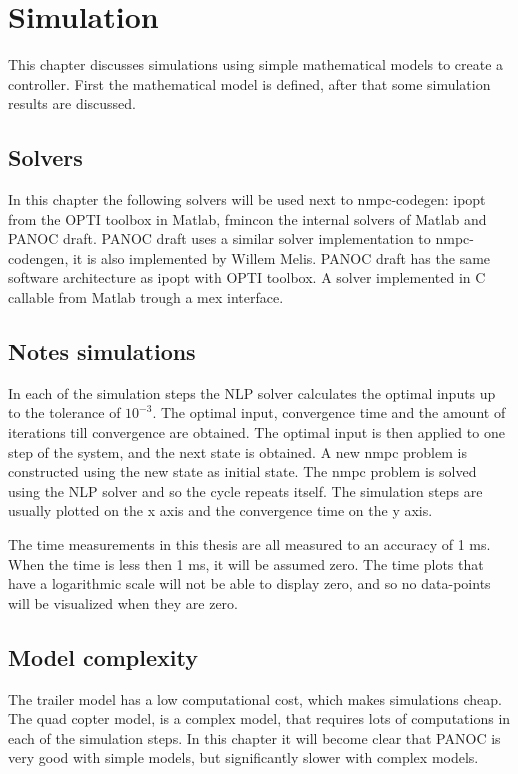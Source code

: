 \chapter{Simulation}
This chapter discusses simulations using simple mathematical models to create a controller. First the mathematical model is defined, after that some simulation results are discussed.

\section{Solvers}
In this chapter the following solvers will be used next to nmpc-codegen: ipopt from the OPTI toolbox in Matlab, fmincon the internal solvers of Matlab and PANOC draft. PANOC draft uses a similar solver implementation to nmpc-codengen, it is also implemented by Willem Melis. PANOC draft has the same software architecture as ipopt with OPTI toolbox. A solver implemented in C callable from Matlab trough a mex interface.

\section{Notes simulations}
In each of the simulation steps the NLP solver calculates the optimal inputs up to the tolerance of $10^{-3}$. The optimal input, convergence time and the amount of iterations till convergence are obtained. The optimal input is then applied to one step of the system, and the next state is obtained. A new nmpc problem is constructed using the new state as initial state. The nmpc problem is solved using the NLP solver and so the cycle repeats itself. The simulation steps are usually plotted on the x axis and the convergence time on the y axis.

The time measurements in this thesis are all measured to an accuracy of 1 ms. When the time is less then 1 ms, it will be assumed zero. The time plots that have a logarithmic scale will not be able to display zero, and so no data-points will be visualized when they are zero.

\section{Model complexity}
The trailer model has a low computational cost, which makes simulations cheap. The quad copter model, is a complex model, that requires lots of computations in each of the simulation steps. In this chapter it will become clear that PANOC is very good with simple models, but significantly slower with complex models.


